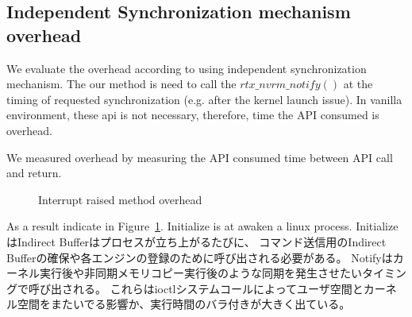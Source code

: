 \subsection{Independent Synchronization mechanism overhead}
We evaluate the overhead according to using independent synchronization mechanism.
The our method is need to call the $rtx\_nvrm\_notify()$ at the timing of requested synchronization (e.g. after the kernel launch issue). 
In vanilla environment, these api is not necessary, therefore, time the API consumed is overhead.

We measured overhead by measuring the API consumed time between API call and return.

\begin{figure}[!t]
\begin{center}
\caption{Interrupt raised method overhead}
\label{fig:irq_rise_overhead}
\end{center}
\end{figure}

As a result indicate in Figure~\ref{fig:irq_rise_overhead}.
Initialize is   at awaken a linux process.
InitializeはIndirect Bufferはプロセスが立ち上がるたびに、
コマンド送信用のIndirect Bufferの確保や各エンジンの登録のために呼び出される必要がある。
Notifyはカーネル実行後や非同期メモリコピー実行後のような同期を発生させたいタイミングで呼び出される。
これらはioctlシステムコールによってユーザ空間とカーネル空間をまたいでる影響か、実行時間のバラ付きが大きく出ている。

